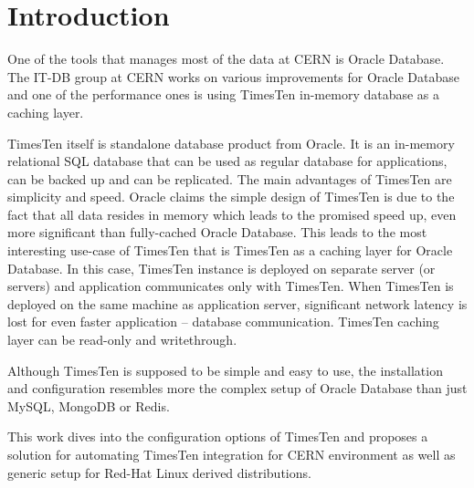 \documentclass[11pt, letterpaper]{article}
\newcommand{\footrulecolor}[1]{\patchcmd{\footrule}{\hrule}{\color{#1}\hrule}{}{}}\fancyhead{} %
\begin{document}
\newpage

{\fontsize{11}{13}\sffamily\linespread{1.750}\selectfont\tableofcontents}
\thispagestyle{fancy}\newpage

\fancyfoot{} %
\renewcommand{\footrulewidth}{0.4pt} %
\footrulecolor{linec}


\section{Introduction}
One of the tools that manages most of the data at CERN is Oracle Database. The IT-DB group at CERN works on various improvements for Oracle Database and one of the performance ones is using TimesTen in-memory database as a caching layer.
\par
TimesTen itself is standalone database product from Oracle. It is an in-memory relational SQL database that can be used as regular database for applications, can be backed up and can be replicated. The main advantages of TimesTen are simplicity and speed. Oracle claims the simple design of TimesTen is due to the fact that all data resides in memory which leads to the promised speed up, even more significant than fully-cached Oracle Database. This leads to the most interesting use-case of TimesTen that is TimesTen as a caching layer for Oracle Database. In this case, TimesTen instance is deployed on separate server (or servers) and application communicates only with TimesTen. When TimesTen is deployed on the same machine as application server, significant network latency is lost for even faster application – database communication. TimesTen caching layer can be read-only and writethrough.

Although TimesTen is supposed to be simple and easy to use, the installation and configuration resembles more the complex setup of Oracle Database than just MySQL, MongoDB or Redis.

This work dives into the configuration options of TimesTen and proposes a solution for automating TimesTen integration for CERN environment as well as generic setup for Red-Hat Linux derived distributions.

\newpage

\end{document}
